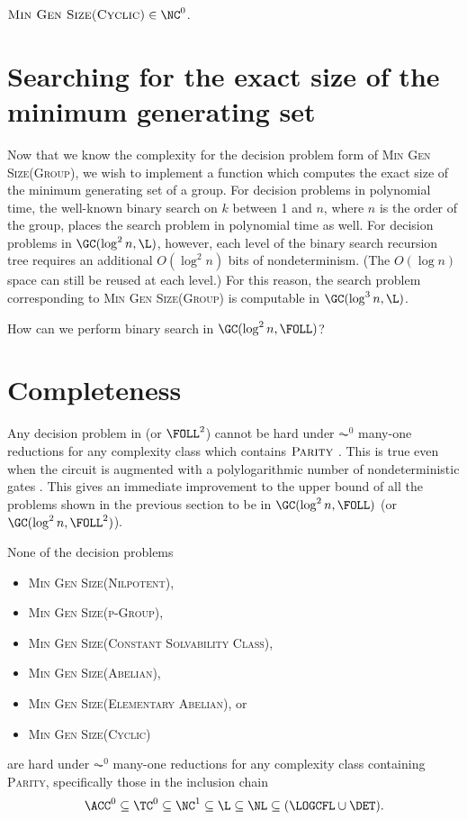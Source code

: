 \documentclass{article}
\begin{document}
\begin{theorem}
  $\textsc{Min Gen Size(Cyclic)} \in \NC^0$.
\end{theorem}

\section{Searching for the exact size of the minimum generating set}

Now that we know the complexity for the decision problem form of \textsc{Min Gen Size(Group)}, we wish to implement a function which computes the exact size of the minimum generating set of a group.
For decision problems in polynomial time, the well-known binary search on $k$ between 1 and $n$, where $n$ is the order of the group, places the search problem in polynomial time as well.
For decision problems in $\GC(\log^2 n, \L)$, however, each level of the binary search recursion tree requires an additional $O(\log^2 n)$ bits of nondeterminism.
(The $O(\log n)$ space can still be reused at each level.)
For this reason, the search problem corresponding to \textsc{Min Gen Size(Group)} is computable in $\GC(\log^3 n, \L)$.

\begin{todo}
  How can we perform binary search in $\GC(\log^2 n, \FOLL)$?
\end{todo}

\section{Completeness}

Any decision problem in \FOLL{} (or $\FOLL^2$) cannot be hard under $\AC^0$ many-one reductions for any complexity class which contains $\textsc{Parity}$ \cite[Section~2.2]{bklm01}.
This is true even when the circuit is augmented with a polylogarithmic number of nondeterministic gates \cite[Section~4]{ctw10}.
This gives an immediate improvement to the upper bound of all the problems shown in the previous section to be in $\GC(\log^2 n, \FOLL)$ (or $\GC(\log^2 n, \FOLL^2)$).

\begin{theorem}
  None of the decision problems
  \begin{itemize}
  \item \textsc{Min Gen Size(Nilpotent)},
  \item \textsc{Min Gen Size(p-Group)},
  \item \textsc{Min Gen Size(Constant Solvability Class)},
  \item \textsc{Min Gen Size(Abelian)},
  \item \textsc{Min Gen Size(Elementary Abelian)}, or
  \item \textsc{Min Gen Size(Cyclic)}
  \end{itemize}
  are hard under $\AC^0$ many-one reductions for any complexity class containing \textsc{Parity}, specifically those in the inclusion chain
  \begin{equation*}
    \ACC^0 \subseteq \TC^0 \subseteq \NC^1 \subseteq \L \subseteq \NL \subseteq (\LOGCFL \cup \DET).
  \end{equation*}
\end{theorem}
\end{document}
